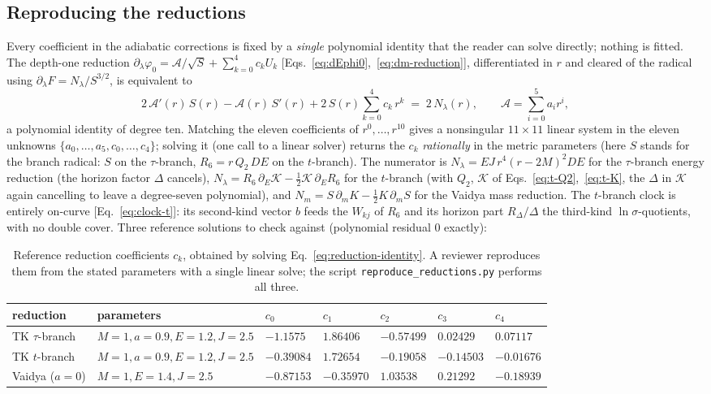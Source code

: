 \documentclass[12pt]{iopart}
\begin{document}
\subsection{Reproducing the reductions}
\label{app:reproduce}
Every coefficient in the adiabatic corrections is fixed by a \emph{single}
polynomial identity that the reader can solve directly; nothing is fitted. The
depth-one reduction $\partial_\lambda\varphi_0=\mathcal{A}/\sqrt S+\sum_{k=0}^4 c_k
U_k$ [Eqs.~\eqref{eq:dEphi0},~\eqref{eq:dm-reduction}], differentiated in $r$ and
cleared of the radical using $\partial_\lambda F=N_\lambda/S^{3/2}$, is equivalent to
\begin{equation}
    2\,\mathcal{A}'(r)\,S(r)-\mathcal{A}(r)\,S'(r)
    +2\,S(r)\sum_{k=0}^4 c_k\,r^k \;=\; 2\,N_\lambda(r),
    \qquad \mathcal{A}=\sum_{i=0}^5 a_i r^i,
    \label{eq:reduction-identity}
\end{equation}
a polynomial identity of degree ten. Matching the eleven coefficients of
$r^0,\dots,r^{10}$ gives a nonsingular $11\times11$ linear system in the eleven
unknowns $\{a_0,\dots,a_5,c_0,\dots,c_4\}$; solving it (one call to a linear solver)
returns the $c_k$ \emph{rationally} in the metric parameters (here $S$ stands for the
branch radical: $S$ on the $\tau$-branch, $R_6=r\,Q_2\,DE$ on the $t$-branch). The
numerator is $N_\lambda=EJ\,r^4(r-2M)^2 DE$ for the $\tau$-branch energy reduction
(the horizon factor $\Delta$ cancels), $N_\lambda=R_6\,\partial_E\mathcal K
-\tfrac12\mathcal K\,\partial_E R_6$ for the $t$-branch (with $Q_2$, $\mathcal K$ of
Eqs.~\eqref{eq:t-Q2},~\eqref{eq:t-K}, the $\Delta$ in $\mathcal K$ again cancelling to
leave a degree-seven polynomial), and $N_m=S\,\partial_m K-\tfrac12K\,\partial_m S$
for the Vaidya mass reduction. The $t$-branch clock is entirely on-curve
[Eq.~\eqref{eq:clock-t}]: its second-kind vector $b$ feeds the $W_{kj}$ of $R_6$ and
its horizon part $R_\Delta/\Delta$ the third-kind $\ln\sigma$-quotients, with no
double cover. Three reference solutions to check against (polynomial residual $0$
exactly):
\begin{table}[htbp]
    \centering
    \caption{Reference reduction coefficients $c_k$, obtained by solving
    Eq.~\eqref{eq:reduction-identity}. A reviewer reproduces them from the stated
    parameters with a single linear solve; the script
    \texttt{reproduce\_reductions.py} performs all three.}
    \label{tab:reduction-ck}
    \begin{tabular}{lllllll}
        \hline\hline
        reduction & parameters & $c_0$ & $c_1$ & $c_2$ & $c_3$ & $c_4$\\
        \hline
        TK $\tau$-branch & $M{=}1,a{=}0.9,E{=}1.2,J{=}2.5$
            & $-1.1575$ & $1.86406$ & $-0.57499$ & $0.02429$ & $0.07117$\\
        TK $t$-branch & $M{=}1,a{=}0.9,E{=}1.2,J{=}2.5$
            & $-0.39084$ & $1.72654$ & $-0.19058$ & $-0.14503$ & $-0.01676$\\
        Vaidya ($a{=}0$) & $M{=}1,E{=}1.4,J{=}2.5$
            & $-0.87153$ & $-0.35970$ & $1.03538$ & $0.21292$ & $-0.18939$\\
        \hline\hline
    \end{tabular}
\end{table}
\end{document}
